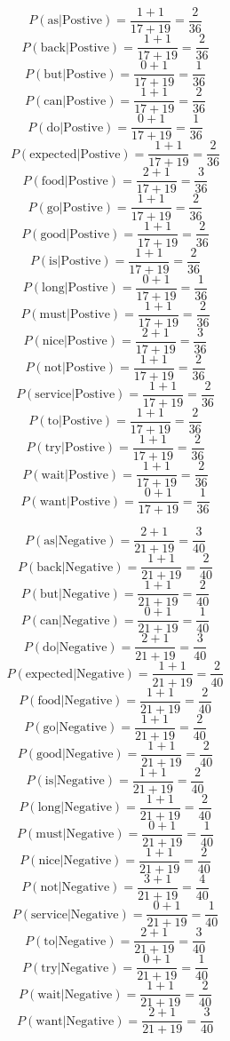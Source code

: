 \documentclass[11pt,a4paper]{report}
\begin{document}
\begin{multicols*}{2}
$$ P(\text{as} | \text{Postive} ) = \frac{1+ 1}{17 + 19} = \frac{2}{36}$$
$$ P(\text{back} | \text{Postive} ) = \frac{1+ 1}{17 + 19} = \frac{2}{36}$$
$$ P(\text{but} | \text{Postive} ) = \frac{0+ 1}{17 + 19} = \frac{1}{36}$$
$$ P(\text{can} | \text{Postive} ) = \frac{1+ 1}{17 + 19} = \frac{2}{36}$$
$$ P(\text{do} | \text{Postive} ) = \frac{0+ 1}{17 + 19} = \frac{1}{36}$$
$$ P(\text{expected} | \text{Postive} ) = \frac{1+ 1}{17 + 19} = \frac{2}{36}$$
$$ P(\text{food} | \text{Postive} ) = \frac{2+ 1}{17 + 19} = \frac{3}{36}$$
$$ P(\text{go} | \text{Postive} ) = \frac{1+ 1}{17 + 19} = \frac{2}{36}$$
$$ P(\text{good} | \text{Postive} ) = \frac{1+ 1}{17 + 19} = \frac{2}{36}$$
$$ P(\text{is} | \text{Postive} ) = \frac{1+ 1}{17 + 19} = \frac{2}{36}$$
$$ P(\text{long} | \text{Postive} ) = \frac{0+ 1}{17 + 19} = \frac{1}{36}$$
$$ P(\text{must} | \text{Postive} ) = \frac{1+ 1}{17 + 19} = \frac{2}{36}$$
$$ P(\text{nice} | \text{Postive} ) = \frac{2+ 1}{17 + 19} = \frac{3}{36}$$
$$ P(\text{not} | \text{Postive} ) = \frac{1+ 1}{17 + 19} = \frac{2}{36}$$
$$ P(\text{service} | \text{Postive} ) = \frac{1+ 1}{17 + 19} = \frac{2}{36}$$
$$ P(\text{to} | \text{Postive} ) = \frac{1+ 1}{17 + 19} = \frac{2}{36}$$
$$ P(\text{try} | \text{Postive} ) = \frac{1+ 1}{17 + 19} = \frac{2}{36}$$
$$ P(\text{wait} | \text{Postive} ) = \frac{1+ 1}{17 + 19} = \frac{2}{36}$$
$$ P(\text{want} | \text{Postive} ) = \frac{0+ 1}{17 + 19} = \frac{1}{36}$$

$$ P(\text{as} | \text{Negative} ) = \frac{2 + 1}{21 + 19} = \frac{3}{40}$$
$$ P(\text{back} | \text{Negative} ) = \frac{1 + 1}{21 + 19} = \frac{2}{40}$$
$$ P(\text{but} | \text{Negative} ) = \frac{1 + 1}{21 + 19} = \frac{2}{40}$$
$$ P(\text{can} | \text{Negative} ) = \frac{0 + 1}{21 + 19} = \frac{1}{40}$$
$$ P(\text{do} | \text{Negative} ) = \frac{2 + 1}{21 + 19} = \frac{3}{40}$$
$$ P(\text{expected} | \text{Negative} ) = \frac{1 + 1}{21 + 19} = \frac{2}{40}$$
$$ P(\text{food} | \text{Negative} ) = \frac{1 + 1}{21 + 19} = \frac{2}{40}$$
$$ P(\text{go} | \text{Negative} ) = \frac{1 + 1}{21 + 19} = \frac{2}{40}$$
$$ P(\text{good} | \text{Negative} ) = \frac{1 + 1}{21 + 19} = \frac{2}{40}$$
$$ P(\text{is} | \text{Negative} ) = \frac{1 + 1}{21 + 19} = \frac{2}{40}$$
$$ P(\text{long} | \text{Negative} ) = \frac{1 + 1}{21 + 19} = \frac{2}{40}$$
$$ P(\text{must} | \text{Negative} ) = \frac{0 + 1}{21 + 19} = \frac{1}{40}$$
$$ P(\text{nice} | \text{Negative} ) = \frac{1 + 1}{21 + 19} = \frac{2}{40}$$
$$ P(\text{not} | \text{Negative} ) = \frac{3 + 1}{21 + 19} = \frac{4}{40}$$
$$ P(\text{service} | \text{Negative} ) = \frac{0 + 1}{21 + 19} = \frac{1}{40}$$
$$ P(\text{to} | \text{Negative} ) = \frac{2 + 1}{21 + 19} = \frac{3}{40}$$
$$ P(\text{try} | \text{Negative} ) = \frac{0 + 1}{21 + 19} = \frac{1}{40}$$
$$ P(\text{wait} | \text{Negative} ) = \frac{1 + 1}{21 + 19} = \frac{2}{40}$$
$$ P(\text{want} | \text{Negative} ) = \frac{2 + 1}{21 + 19} = \frac{3}{40}$$


\end{multicols*}
\end{document}
